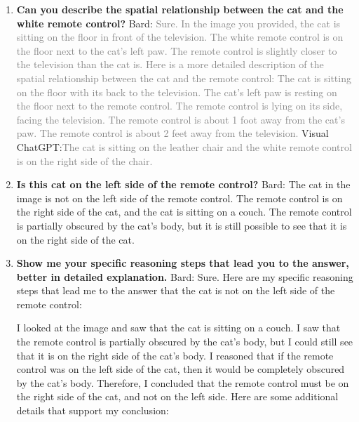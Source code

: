     \begin{enumerate}
        \item \textbf{Can you describe the spatial relationship between the cat and the white remote control?}
        \subitem Bard: \textcolor{gray}{    
        Sure. In the image you provided, the cat is sitting on the floor in front of the television. The white remote control is on the floor next to the cat's left paw. The remote control is slightly closer to the television than the cat is.
        Here is a more detailed description of the spatial relationship between the cat and the remote control:
        The cat is sitting on the floor with its back to the television.
        The cat's left paw is resting on the floor next to the remote control.
        The remote control is lying on its side, facing the television.
        The remote control is about 1 foot away from the cat's paw.
        The remote control is about 2 feet away from the television.}
        \subitem Visual ChatGPT:\textcolor{gray}{The cat is sitting on the leather chair and the white remote control is on the right side of the chair.}
        \item \textbf{Is this cat on the left side of the remote control?}
        \subitem Bard: The cat in the image is not on the left side of the remote control. The remote control is on the right side of the cat, and the cat is sitting on a couch. The remote control is partially obscured by the cat's body, but it is still possible to see that it is on the right side of the cat.
        \item \textbf{Show me your specific reasoning steps that lead you to the answer, better in detailed explanation.}
        \subitem Bard: 
        Sure. Here are my specific reasoning steps that lead me to the answer that the cat is not on the left side of the remote control:
        
        I looked at the image and saw that the cat is sitting on a couch.
        I saw that the remote control is partially obscured by the cat's body, but I could still see that it is on the right side of the cat's body.
        I reasoned that if the remote control was on the left side of the cat, then it would be completely obscured by the cat's body.
        Therefore, I concluded that the remote control must be on the right side of the cat, and not on the left side.
        Here are some additional details that support my conclusion:
        

\end{enumerate}
